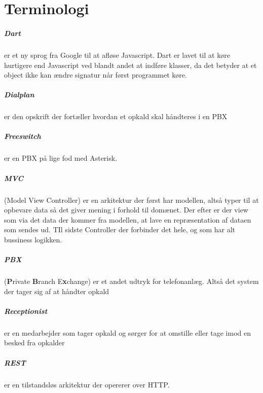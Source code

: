 \chapter{Terminologi}

\paragraph{Dart} er et ny sprog fra Google til at afløse Javascript. Dart er lavet til at køre hurtigere end Javascript ved blandt andet at indføre klasser, da det betyder at et object ikke kan ændre signatur når først programmet køre.

\paragraph{Dialplan} er den opskrift der fortæller hvordan et opkald skal håndteres i en PBX

\paragraph{Freeswitch} er en PBX på lige fod med Asterisk.

\paragraph{MVC} (Model View Controller) er en arkitektur der først har modellen, altså typer til at opbevare data så det giver mening i forhold til domænet. Der efter er der view som via det data der kommer fra modellen, at lave en repræsentation af dataen som sendes ud. TIl sidste Controller der forbinder det hele, og som har alt bussiness logikken.

\paragraph{PBX} (\textbf{P}rivate \textbf{B}ranch E\textbf{x}change) er et andet udtryk for telefonanlæg. Altså det system der tager sig af at håndter opkald

\paragraph{Receptionist} er en medarbejder som tager opkald og sørger for at omstille eller tage imod en besked fra opkalder

\paragraph{REST} er en tilstandsløs arkitektur der opererer over HTTP.

